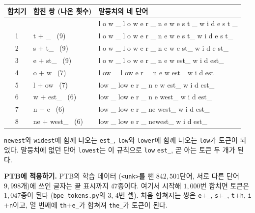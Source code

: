 \documentclass[11pt,a4paper]{article}
\newcommand{\w}[1]{\texttt{#1}}
\begin{document}
\begin{center}
\ttfamily\small
\begin{tabular}{@{}cll@{}}
\toprule
\rmfamily 합치기 & \rmfamily 합친 쌍 (나온 횟수) & \rmfamily 말뭉치의 네 단어 \\
\midrule
& & l o w \_ \quad l o w e r \_ \quad n e w e s t \_ \quad w i d e s t \_ \\
1 & t $+$ \_ \ (9) & l o w \_ \quad l o w e r \_ \quad n e w e s t\_ \quad w i d e s t\_ \\
2 & s $+$ t\_ \ (9) & l o w \_ \quad l o w e r \_ \quad n e w e st\_ \quad w i d e st\_ \\
3 & e $+$ st\_ \ (9) & l o w \_ \quad l o w e r \_ \quad n e w est\_ \quad w i d est\_ \\
4 & o $+$ w \ (7) & l ow \_ \quad l ow e r \_ \quad n e w est\_ \quad w i d est\_ \\
5 & l $+$ ow \ (7) & low \_ \quad low e r \_ \quad n e w est\_ \quad w i d est\_ \\
6 & w $+$ est\_ \ (6) & low \_ \quad low e r \_ \quad n e west\_ \quad w i d est\_ \\
7 & n $+$ e \ (6) & low \_ \quad low e r \_ \quad ne west\_ \quad w i d est\_ \\
8 & ne $+$ west\_ \ (6) & low \_ \quad low e r \_ \quad newest\_ \quad w i d est\_ \\
\bottomrule
\end{tabular}
\end{center}

\w{newest}와 \w{widest}에 함께 나오는 \w{est\_}, \w{low}와 \w{lower}에 함께 나오는 \w{low}가 토큰이 되었다.
말뭉치에 없던 단어 \w{lowest}는 이 규칙으로 \w{low} \w{est\_}, 곧 아는 토큰 두 개가 된다.

\textbf{PTB에 적용하기.} PTB의 학습 데이터 (\w{<unk>}를 뺀 $842{,}501$단어, 서로 다른 단어 $9{,}998$개)에 쓰인 글자는 끝 표시까지 $47$종이다. 여기서 시작해 $1{,}000$번 합치면 토큰은 $1{,}047$종이 된다 (\texttt{bpe\_tokens.py}의 3, 4번 셀).
처음 합쳐지는 쌍은 \w{e}$+$\w{\_}, \w{s}$+$\w{\_}, \w{t}$+$\w{h}, \w{i}$+$\w{n}이고, 열 번째에 \w{th}$+$\w{e\_}가 합쳐져 \w{the\_}가 토큰이 된다.
\end{document}
